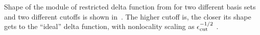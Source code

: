 Shape of the module of restricted delta function from  for two different basis sets and two different cutoffs is shown in~.
The higher cutoff is, the closer its shape gets to the ``ideal'' delta function,
with nonlocality scaling as $\epsilon_{\mathrm{cut}}^{-1/2}$ .
